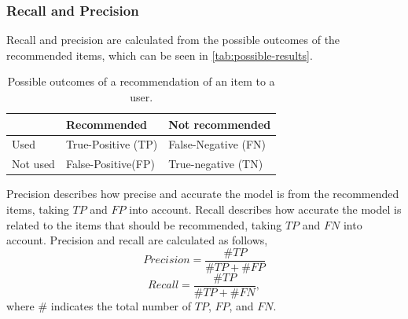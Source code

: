 \subsubsection{Recall and Precision}
Recall and precision are calculated from the possible outcomes of the recommended items, which can be seen in \autoref{tab:possible-results}.
\begin{table}[]
    \centering
    \begin{tabular}{|l|l|l|}
        \hline
        \rowcolor[HTML]{FFFFFF}
                 & Recommended        & Not recommended     \\ \hline
        Used     & True-Positive (TP) & False-Negative (FN) \\ \hline
        Not used & False-Positive(FP) & True-negative (TN)  \\ \hline
    \end{tabular}
    \caption{Possible outcomes of a recommendation of an item to a user.}
    \label{tab:possible-results}
\end{table}
Precision describes how precise and accurate the model is from the recommended items, taking $TP$ and $FP$ into account.
Recall describes how accurate the model is related to the items that should be recommended, taking $TP$ and $FN$ into account.
Precision and recall are calculated as follows,
\begin{equation}
    Precision = \frac{\#TP}{\#TP + \# FP}
\end{equation}
\begin{equation}
    Recall = \frac{\#TP}{\#TP + \# FN},
\end{equation}
where \# indicates the total number of $TP$, $FP$, and $FN$.
